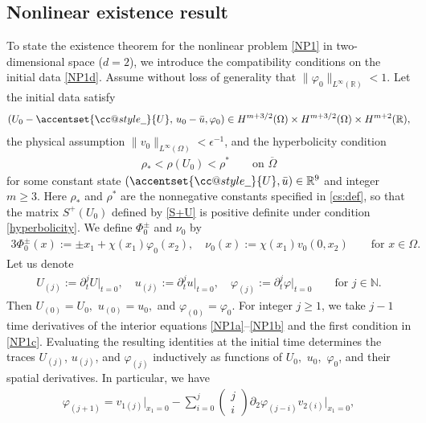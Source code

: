 \documentclass[twoside,11pt]{article}
\makeatletter
\numberwithin{equation}{section}
\def\p{\partial}
\def\widebar{\accentset{{\cc@style\underline{\mskip10mu}}}}
\makeatother
\begin{document}
\subsection{Nonlinear existence result}	

To state the existence theorem for the nonlinear problem \eqref{NP1} in two-dimensional space ($d=2$), we introduce the compatibility conditions on the initial data \eqref{NP1d}.
Assume without loss of generality that $\|\varphi_0\|_{L^{\infty}(\mathbb{R})}<1$.
Let the initial data satisfy
\begin{align}  \label{initial:H1}
	(U_0-\widebar{U},\, u_0-\bar{u},\varphi_0)\in H^{m+3/2}(\Omega)\times  H^{m+3/2}(\Omega)\times  H^{m+2}(\mathbb{R}),
\end{align}
{the physical assumption $\|v_0\|_{L^{\infty}(\Omega)}<\epsilon^{-1}$},
and the hyperbolicity condition
\begin{align}
	\label{hyperbolicity}
	\rho_*< \rho(U_0)<\rho^* \qquad \textrm{on }\overline{\Omega}
\end{align}
for some constant state $(\widebar{U},\bar{u})\in\mathbb{R}^9$ and integer $m\geq 3$.
{Here $\rho_*$ and $\rho^*$ are the nonnegative constants specified in \eqref{cs:def}, so that the
	matrix $S^+(U_0)$ defined by \eqref{S+U} is positive definite under condition \eqref{hyperbolicity}.}
We define $\Phi_0^{\pm}$ and $\nu_0$ %
by
\begin{alignat}{3}
	\Phi_0^{\pm}(x):=\pm x_1+\chi(x_1)\varphi_0(x_2),\quad
	\nu_0(x):=\chi(x_1)v_0(0, x_2) \qquad   \textrm{for  }   x\in \Omega.
	\nonumber %
\end{alignat}
Let us denote
\begin{align*}
	U_{(j)}  := \p_t^{j }U\big|_{t=0},\quad
	u_{(j)}  := \p_t^{j }u\big|_{t=0},\quad
	\varphi_{(j)}:= \p_t^{j}\varphi\big|_{t=0}\qquad
	\textrm{for }j\in\mathbb{N}.
\end{align*}
Then
${U}_{(0)}={U}_0,$ $u_{(0)}=u_0,$ and $\varphi_{(0)}=\varphi_0.$
For integer $j\geq 1$, we take $j-1$ time derivatives of the interior equations \eqref{NP1a}--\eqref{NP1b} and the first condition in \eqref{NP1c}.
Evaluating the resulting identities at the initial time determines the traces $U_{(j)}  $, $u_{(j)}  $, and $\varphi_{(j)}$ inductively as functions of $U_0,$  $u_0,$ $\varphi_0$, and their spatial derivatives.
In particular, we have
\begin{align}
	\varphi_{(j+1)} = v_{1(j)}\big|_{x_1=0}-\sum_{i=0}^{j}
	\begin{pmatrix}
		j \\ i
	\end{pmatrix}  \p_2\varphi_{(j-i)}v_{2(i)}\big|_{x_1=0},
	\label{trace.id1}
\end{align}
\end{document}
